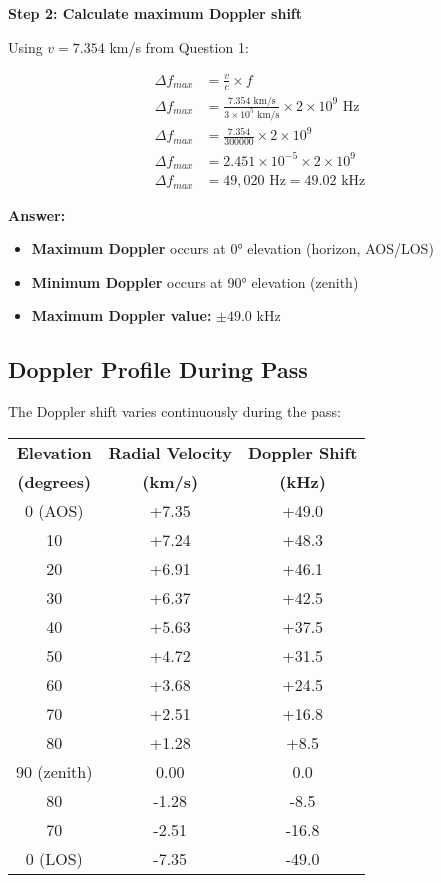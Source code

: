 \documentclass[11pt,letterpaper]{article}
\begin{document}
\textbf{Step 2: Calculate maximum Doppler shift}

Using $v = 7.354$ km/s from Question 1:

\begin{align}
\Delta f_{max} &= \frac{v}{c} \times f \\
\Delta f_{max} &= \frac{7.354 \text{ km/s}}{3 \times 10^5 \text{ km/s}} \times 2 \times 10^9 \text{ Hz} \\
\Delta f_{max} &= \frac{7.354}{300000} \times 2 \times 10^9 \\
\Delta f_{max} &= 2.451 \times 10^{-5} \times 2 \times 10^9 \\
\Delta f_{max} &= 49,020 \text{ Hz} = 49.02 \text{ kHz}
\end{align}

\textbf{Answer:}
\begin{itemize}
    \item \textbf{Maximum Doppler} occurs at 0° elevation (horizon, AOS/LOS)
    \item \textbf{Minimum Doppler} occurs at 90° elevation (zenith)
    \item \textbf{Maximum Doppler value:} $\pm 49.0$ kHz
\end{itemize}

\subsection{Doppler Profile During Pass}

The Doppler shift varies continuously during the pass:

\begin{center}
\begin{tabular}{@{}ccc@{}}
\toprule
\textbf{Elevation} & \textbf{Radial Velocity} & \textbf{Doppler Shift} \\
\textbf{(degrees)} & \textbf{(km/s)} & \textbf{(kHz)} \\
\midrule
0  (AOS) & +7.35 & +49.0 \\
10  & +7.24 & +48.3 \\
20  & +6.91 & +46.1 \\
30  & +6.37 & +42.5 \\
40  & +5.63 & +37.5 \\
50  & +4.72 & +31.5 \\
60  & +3.68 & +24.5 \\
70  & +2.51 & +16.8 \\
80  & +1.28 & +8.5 \\
90  (zenith) & 0.00 & 0.0 \\
80  & -1.28 & -8.5 \\
70  & -2.51 & -16.8 \\
0  (LOS) & -7.35 & -49.0 \\
\bottomrule
\end{tabular}
\end{center}
\end{document}
